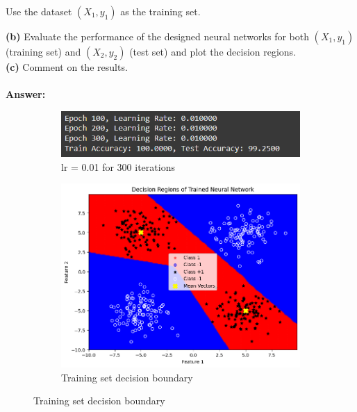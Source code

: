 \documentclass[a4paper,12pt]{article}
\begin{document}
Use the dataset $(X_1, y_1)$ as the training set.

\textbf{(b)} Evaluate the performance of the designed neural networks for both $(X_1, y_1)$ (training set) and $(X_2, y_2)$ (test set) and plot the decision regions.
\\
\textbf{(c)} Comment on the results.\\
\\
\textbf{Answer:}

\begin{figure}[H]
    \centering
    \captionsetup[subfigure]{list=true} %

    \begin{subfigure}{0.5\textwidth}
        \centering
        \includegraphics[width=\textwidth]{2.3_.01_300_r.png}
        \caption{lr = 0.01 for 300 iterations}
    \end{subfigure}
    \begin{subfigure}{0.45\textwidth}
        \centering
        \includegraphics[width=\textwidth]{2.3_.01_300_Train.png}
        \caption{Training set decision boundary}
    \end{subfigure}


\end{figure}
\end{document}
